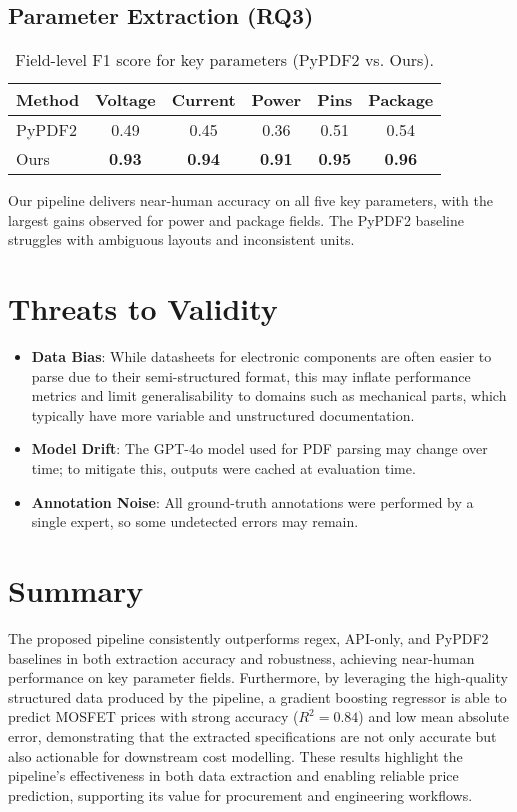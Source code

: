 \subsection{Parameter Extraction (RQ3)}
\begin{table}[H]
\centering
\caption{Field-level F1 score for key parameters (PyPDF2 vs. Ours).}
\label{tab:fields}
\begin{tabular}{lccccc}
\toprule
Method & Voltage & Current & Power & Pins & Package \\
\midrule
PyPDF2    & 0.49 & 0.45 & 0.36 & 0.51 & 0.54 \\
Ours      & \textbf{0.93} & \textbf{0.94} & \textbf{0.91} & \textbf{0.95} & \textbf{0.96} \\
\bottomrule
\end{tabular}
\end{table}
Our pipeline delivers near-human accuracy on all five key parameters, with the largest gains observed for power and package fields. The PyPDF2 baseline struggles with ambiguous layouts and inconsistent units.

\section{Threats to Validity}
\begin{itemize}
  \item \textbf{Data Bias}: While datasheets for electronic components are often easier to parse due to their semi-structured format, this may inflate performance metrics and limit generalisability to domains such as mechanical parts, which typically have more variable and unstructured documentation.
  \item \textbf{Model Drift}: The GPT-4o model used for PDF parsing may change over time; to mitigate this, outputs were cached at evaluation time.
  \item \textbf{Annotation Noise}: All ground-truth annotations were performed by a single expert, so some undetected errors may remain.
\end{itemize}



\section{Summary}
The proposed pipeline consistently outperforms regex, API-only, and PyPDF2 baselines in both extraction accuracy and robustness, achieving near-human performance on key parameter fields. Furthermore, by leveraging the high-quality structured data produced by the pipeline, a gradient boosting regressor is able to predict MOSFET prices with strong accuracy ($R^2 = 0.84$) and low mean absolute error, demonstrating that the extracted specifications are not only accurate but also actionable for downstream cost modelling. These results highlight the pipeline's effectiveness in both data extraction and enabling reliable price prediction, supporting its value for procurement and engineering workflows.